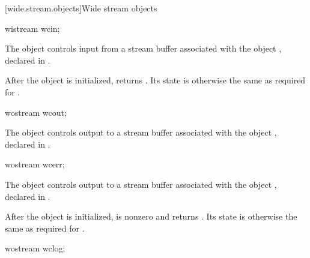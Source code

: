 [wide.stream.objects]{Wide stream objects}

\begin{indexed}{}
\begin{itemdecl}
wistream wcin;
\end{itemdecl}
\end{indexed}

\begin{itemdescr}
\pnum
The object 
controls input from a stream buffer associated with the object ,
declared in .

\pnum
After the object
is initialized,
returns
.
Its state is otherwise the same as required for
.
\end{itemdescr}

\begin{indexed}{}
\begin{itemdecl}
wostream wcout;
\end{itemdecl}
\end{indexed}

\begin{itemdescr}
\pnum
The object 
controls output to a stream buffer associated with the object ,
declared in .
\end{itemdescr}

\begin{indexed}{}
\begin{itemdecl}
wostream wcerr;
\end{itemdecl}
\end{indexed}

\begin{itemdescr}
\pnum
The object 
controls output to a stream buffer associated with the object ,
declared in .

\pnum
After the object
is initialized,
is nonzero and  returns .
Its state is otherwise the same as required for
.
\end{itemdescr}

\begin{indexed}{}
\begin{itemdecl}
wostream wclog;
\end{itemdecl}
\end{indexed}

